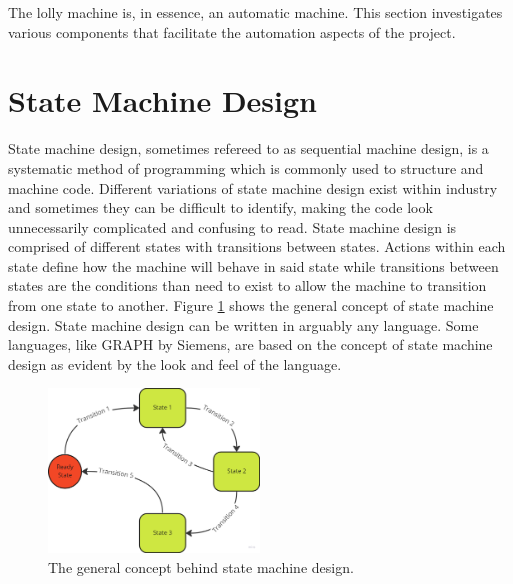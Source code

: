 
The lolly machine is, in essence, an automatic machine. This section investigates various components that facilitate the automation aspects of the project.

\section{State Machine Design}
    State machine design, sometimes refereed to as sequential machine design, is a systematic method of programming which is commonly used to structure and machine code. Different variations of state machine design exist within industry and sometimes they can be difficult to identify, making the code look unnecessarily complicated and confusing to read. State machine design is comprised of different states with transitions between states. Actions within each state define how the machine will behave in said state while transitions between states are the conditions than need to exist to allow the machine to transition from one state to another. Figure \ref{fig:stateMachineEx} shows the general concept of state machine design. State machine design can be written in arguably any language. Some languages, like GRAPH by Siemens, are based on the concept of state machine design as evident by the look and feel of the language\cite{siemensGraph}. 


        \begin{figure}[H]
        \centering
        \includegraphics[width = 0.5\textwidth]{2_images/stateMachineEx}
        \caption{The general concept behind state machine design.}
        \label{fig:stateMachineEx}
    \end{figure}

